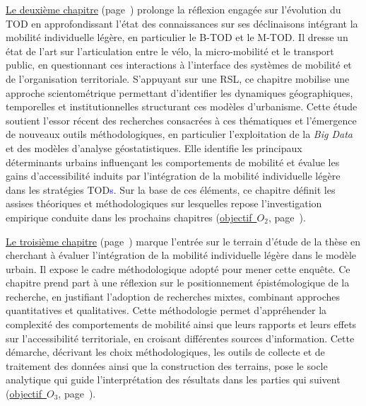 \begin{refsegment}
\hyperref[chap2:titre]{Le deuxième chapitre} (page~\pageref{chap2:titre}) prolonge la réflexion engagée sur l’évolution du \acrshort{TOD} en approfondissant l’état des connaissances sur ses déclinaisons intégrant la mobilité individuelle légère, en particulier le \acrshort{B-TOD} et le \acrshort{M-TOD}. Il dresse un état de l’art sur l’articulation entre le vélo, la micro-mobilité et le transport public, en questionnant ces interactions à l'interface des systèmes de mobilité et de l'organisation territoriale. S’appuyant sur une \acrfull{RSL}, ce chapitre mobilise une approche scientométrique permettant d’identifier les dynamiques géographiques, temporelles et institutionnelles structurant ces modèles d'urbanisme. Cette étude soutient l’essor récent des recherches consacrées à ces thématiques et l’émergence de nouveaux outils méthodologiques, en particulier l’exploitation de la \textsl{Big Data} et des modèles d'analyse géostatistiques. Elle identifie les principaux déterminants urbains influençant les comportements de mobilité et évalue les gains d’accessibilité induits par l’intégration de la mobilité individuelle légère dans les stratégies \acrshort{TOD}\textcolor{blue}{s}. Sur la base de ces éléments, ce chapitre définit les assises théoriques et méthodologiques sur lesquelles repose l'investigation empirique conduite dans les prochains chapitres (\hyperref[objectif-2]{objectif~\(O_2\)}, page~\pageref{objectif-2}).%

\hyperref[chap3:titre]{Le troisième chapitre} (page~\pageref{chap3:titre}) marque l'entrée sur le terrain d'étude de la thèse en cherchant à évaluer l'intégration de la mobilité individuelle légère dans le modèle urbain. Il expose le cadre méthodologique adopté pour mener cette enquête. Ce chapitre prend part à une réflexion sur le positionnement épistémologique de la recherche, en justifiant l’adoption de recherches mixtes, combinant approches quantitatives et qualitatives. Cette méthodologie permet d’appréhender la complexité des comportements de mobilité ainsi que leurs rapports et leurs effets sur l'accessibilité territoriale, en croisant différentes sources d’information. Cette démarche, décrivant les choix méthodologiques, les outils de collecte et de traitement des données ainsi que la construction des terrains, pose le socle analytique qui guide l’interprétation des résultats dans les parties qui suivent (\hyperref[objectif-3]{objectif~\(O_3\)}, page~\pageref{objectif-3}).%


\end{refsegment}
